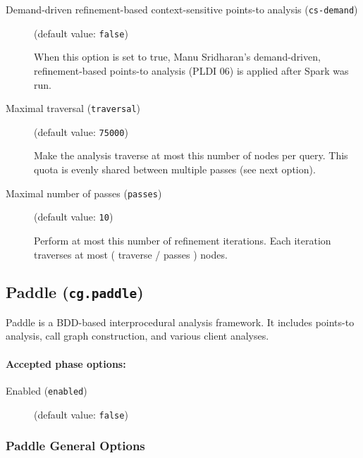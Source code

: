 \documentclass{article}
\begin{document}
\begin{description}

\item[Demand-driven refinement-based context-sensitive points-to analysis ({\tt cs-demand})]
(default value: {\tt false})




When this option is set to true, Manu Sridharan's demand-driven,
refinement-based points-to analysis (PLDI 06) is applied after Spark
was run.
        					


\item[Maximal traversal ({\tt traversal})]
(default value: {\tt 75000})




Make the analysis traverse at most this number of nodes per query.
This quota is evenly shared between multiple passes (see next option).
        					


\item[Maximal number of passes ({\tt passes})]
(default value: {\tt 10})




Perform at most this number of refinement iterations.
Each iteration traverses at most ( traverse / passes ) nodes.
        					


\end{description}

\subsection{Paddle ({\tt cg.paddle})}
Paddle is a BDD-based interprocedural analysis framework. It includes points-to analysis, call graph construction, and various client analyses.

\paragraph{Accepted phase options:} 

\begin{description}

\item[Enabled ({\tt enabled})]
(default value: {\tt false})






\end{description}

\subsubsection{Paddle General Options}
\end{document}
